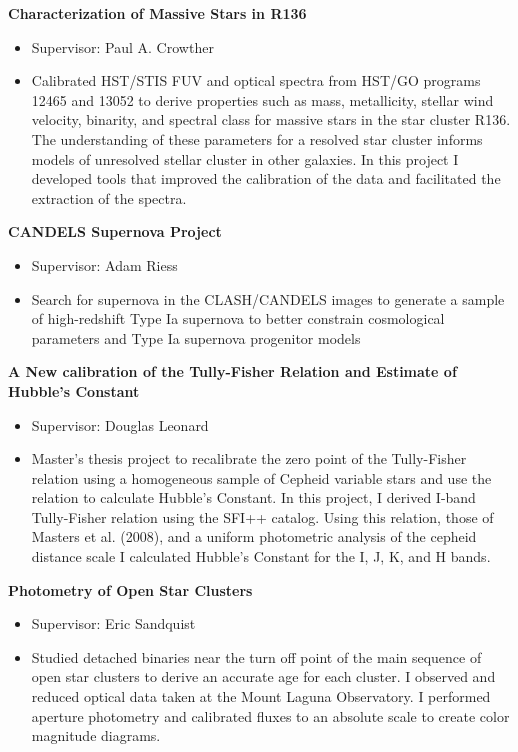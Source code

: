 \documentclass{res}
\begin{document}
\begin{resume}
   {\bf  Characterization of Massive Stars in R136 } 
        \begin{itemize}
        \item[] Supervisor: Paul A. Crowther
        \item[] Calibrated HST/STIS FUV and optical spectra from HST/GO programs 12465 and 13052 to derive properties such as mass, metallicity, stellar wind velocity, binarity, and spectral class for massive stars in the star cluster R136. The understanding of these parameters for a resolved star cluster informs models of unresolved stellar cluster in other galaxies. In this project I developed tools that improved the calibration of the data and facilitated the extraction of the spectra.
        \end{itemize} 
        
	{\bf CANDELS Supernova Project}
		\begin{itemize}
		\item[] Supervisor: Adam Riess
		\item[] Search for supernova in the CLASH/CANDELS images to generate a sample of high-redshift Type Ia supernova to better constrain cosmological parameters and Type Ia supernova progenitor models
		\end{itemize}

   {\bf  A New calibration of the Tully-Fisher Relation and Estimate of Hubble's Constant} 
           \begin{itemize}
   	\item[] Supervisor: Douglas Leonard
        \item[] Master's thesis project to recalibrate the zero point of the Tully-Fisher relation using a homogeneous
        sample of Cepheid variable stars and use the relation to calculate Hubble's Constant. In this project, I derived I-band Tully-Fisher relation using the SFI++ catalog. Using this relation, those of Masters et al. (2008), and a uniform photometric analysis of the cepheid distance scale I calculated Hubble's Constant for the I, J, K, and H bands.
        \end{itemize} 
        
   {\bf Photometry of Open Star Clusters }
      		\begin{itemize}
   		\item[] Supervisor: Eric Sandquist
		\item[] Studied detached binaries near the turn off point of the main sequence of open star clusters to derive an accurate age for each cluster. I observed and reduced optical data taken at the Mount Laguna Observatory. I performed aperture photometry and calibrated fluxes to an absolute scale to create color magnitude diagrams.
   		\end{itemize}
   		

\end{resume}
\end{document}
